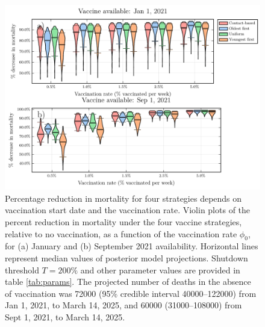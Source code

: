 \begin{figure}
  \includegraphics[width=\textwidth]{chapter_1/vaccination_by_mortality_small.pdf}  
  \caption[Percentage reduction in mortality for four strategies depends on vaccination start date and the vaccination rate.]{Percentage reduction in mortality for four strategies depends on vaccination start date and the vaccination rate.  Violin plots of the percent reduction in mortality under the four vaccine strategies, relative to no vaccination, as a function of the vaccination rate $\phi_0$, for (a) January and (b) September 2021 availability. Horizontal lines represent median values of posterior model projections. Shutdown threshold $T = 200\%$ and other parameter values are provided in table \ref{tab:params}. The projected number of deaths in the absence of vaccination was 72000 (95\% credible interval 40000–122000) from Jan 1, 2021, to March 14, 2025, and 60000 (31000–108000) from Sept 1, 2021, to March 14, 2025.}
  \label{fig4}
\end{figure}
